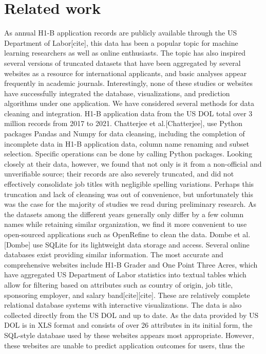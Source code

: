 \documentclass[sigconf]{acmart}
\begin{document}
\section{Related work}

As annual H1-B application records are publicly available through the US Department of Labor[cite], 
this data has been a popular topic for machine learning researchers as well as online enthusiasts. 
The topic has also inspired several versions of truncated datasets that have been aggregated by several websites as a resource 
for international applicants, and basic analyses appear frequently in academic journals. Interestingly, none of these studies or 
websites have successfully integrated the database, visualizations, and prediction algorithms under one application. 
We have considered several methods for data cleaning and integration. H1-B application data from the US DOL total over 3 million 
records from 2017 to 2021. Chatterjee et al.[Chatterjee], use Python packages Pandas and Numpy for data cleansing, including the 
completion of incomplete data in H1-B application data, column name renaming and subset selection. Specific operations can be done 
by calling Python packages. Looking closely at their data, however, we found that not only is it from a non-official and unverifiable 
source; their records are also severely truncated, and did not effectively consolidate job titles with negligible spelling variations. 
Perhaps this truncation and lack of cleansing was out of convenience, but unfortunately this was the case for the majority of studies 
we read during preliminary research. As the datasets among the different years generally only differ by a few column names while 
retaining similar organization, we find it more convenient to use open-sourced applications such as OpenRefine to clean the data. 
Dombe et al.[Dombe] use SQLite for its lightweight data storage and access.
Several online databases exist providing similar information. The most accurate and comprehensive websites include H1-B Grader and 
One Point Three Acres, which have aggregated US Department of Labor statistics into textual tables which allow for filtering based 
on attributes such as country of origin, job title, sponsoring employer, and salary band[cite][cite]. These are relatively complete 
relational database systems with interactive visualizations. The data is also collected directly from the US DOL and up to date. 
As the data provided by US DOL is in XLS format and consists of over 26 attributes in its initial form, the SQL-style database used 
by these websites appears most appropriate. However, these websites are unable to predict application outcomes for users, thus the 
\end{document}
